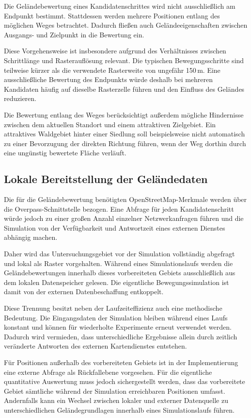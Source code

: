 \documentclass[12pt,a4paper]{report}
\begin{document}
Die Geländebewertung eines Kandidatenschrittes wird nicht ausschließlich am
Endpunkt bestimmt. Stattdessen werden mehrere Positionen entlang des möglichen
Weges betrachtet. Dadurch fließen auch Geländeeigenschaften zwischen Ausgangs-
und Zielpunkt in die Bewertung ein.

Diese Vorgehensweise ist insbesondere aufgrund des Verhältnisses zwischen
Schrittlänge und Rasterauflösung relevant. Die typischen Bewegungsschritte sind
teilweise kürzer als die verwendete Rasterweite von ungefähr 150\,m. Eine
ausschließliche Bewertung des Endpunkts würde deshalb bei mehreren Kandidaten
häufig auf dieselbe Rasterzelle führen und den Einfluss des Geländes reduzieren.

Die Bewertung entlang des Weges berücksichtigt außerdem mögliche Hindernisse
zwischen dem aktuellen Standort und einem attraktiven Zielgebiet. Ein attraktives
Waldgebiet hinter einer Siedlung soll beispielsweise nicht automatisch zu einer
Bevorzugung der direkten Richtung führen, wenn der Weg dorthin durch eine
ungünstig bewertete Fläche verläuft.

\subsection{Lokale Bereitstellung der Geländedaten}
\label{subsec:terrain_cache}

Die für die Geländebewertung benötigten OpenStreetMap-Merkmale werden über die
Overpass-Schnittstelle bezogen. Eine Abfrage für jeden Kandidatenschritt würde
jedoch zu einer großen Anzahl einzelner Netzwerkanfragen führen und die
Simulation von der Verfügbarkeit und Antwortzeit eines externen Dienstes
abhängig machen.

Daher wird das Untersuchungsgebiet vor der Simulation vollständig abgefragt und
lokal als Raster vorgehalten. Während eines Simulationslaufs werden die
Geländebewertungen innerhalb dieses vorbereiteten Gebiets ausschließlich aus
dem lokalen Datenspeicher gelesen. Die eigentliche Bewegungssimulation ist damit
von der externen Datenbeschaffung entkoppelt.

Diese Trennung besitzt neben der Laufzeiteffizienz auch eine methodische
Bedeutung. Die Eingangsdaten der Simulation bleiben während eines Laufs konstant
und können für wiederholte Experimente erneut verwendet werden. Dadurch wird
vermieden, dass unterschiedliche Ergebnisse allein durch zeitlich veränderte
Antworten des externen Kartendienstes entstehen.

Für Positionen außerhalb des vorbereiteten Gebiets ist in der Implementierung
eine externe Abfrage als Rückfallebene vorgesehen. Für die eigentliche
quantitative Auswertung muss jedoch sichergestellt werden, dass das vorbereitete
Gebiet sämtliche während der Simulation erreichbaren Positionen umfasst. Andernfalls
kann ein Wechsel zwischen lokaler und externer Datenquelle zu unterschiedlichen
Geländegrundlagen innerhalb eines Simulationslaufs führen.
\end{document}
